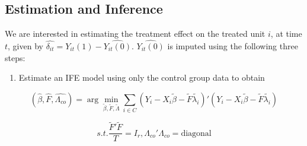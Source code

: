 \documentclass[12pt,nobind, a4paper]{reedthesis}
\providecommand{\tightlist}{%
	\setlength{\itemsep}{0pt}\setlength{\parskip}{0pt}}
\begin{document}
 \hypertarget{estimation-and-inference}{%
 \subsection{Estimation and Inference}\label{estimation-and-inference}}

 We are interested in estimating the treatment effect on the treated unit \(i\), at time \(t\), given by \(\hat{\delta_{it}}= Y_{it}(1)-\hat{Y_{it}(0)}\). \(\hat{Y_{it}(0)}\) is imputed using the following three steps:
 \linebreak
 \begin{enumerate}
 \def\labelenumi{\arabic{enumi}.}
 \tightlist
 \item
   Estimate an IFE model using only the control group data to obtain
 \end{enumerate}
 \[(\hat{\beta},\hat{F},\hat{\Lambda_{co}})=\arg\min_{\tilde{\beta},\tilde{F},\tilde{\Lambda}}\sum_{i\in C}(Y_{i}-X_{i} \tilde{\beta}-\tilde{F}\tilde{\lambda_{i}})'(Y_{i}-X_{i}\tilde{\beta}-\tilde{F}\tilde{\lambda_{i}})\]

 \[s.t. \frac{\tilde{F}'\tilde{F}}{T}=I_{r}
 , \Lambda_{co}'\Lambda_{co}=\text{diagonal}\]
\end{document}
